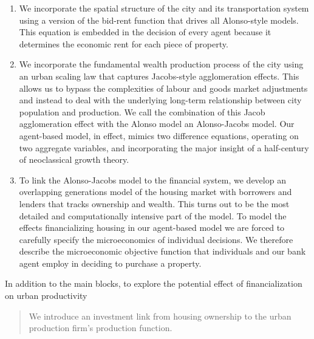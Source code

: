 
\begin{enumerate}
\item We incorporate the spatial structure of the city and its transportation system using a version of the \gls{bid-rent function} that drives all Alonso-style models. This equation is embedded in the decision of every agent because it determines the economic rent for each piece of property.

\item We incorporate the fundamental wealth production process of the city using an \gls{urban scaling} law that captures Jacobs-style agglomeration effects. This allows us to bypass the complexities of labour and goods market adjustments and instead to deal with the underlying long-term relationship between city population and production. We call the combination of this Jacob agglomeration effect with the Alonso model an \gls{Alonso-Jacobs model}. Our \gls{agent-based model}, in effect, mimics two difference equations, operating on two aggregate variables, and incorporating the major insight of a half-century of \gls{neoclassical growth theory}.

\item To link the Alonso-Jacobs model to the financial system, we develop an \gls{overlapping generations} model of the housing market with borrowers and lenders that tracks ownership and wealth. This turns out to be the most detailed and computationally intensive part of the model. To model the effects financializing housing in our \gls{agent-based model} we are forced to carefully specify the microeconomics of individual decisions. %
We therefore describe the microeconomic objective function that individuals and our bank agent employ in deciding to purchase a property. 
\end{enumerate}
In addition to the main blocks, to explore the potential effect of financialization on urban productivity 
\begin{quotation}\noindent We introduce an investment link from housing ownership to the urban production firm's production function.
\end{quotation}




